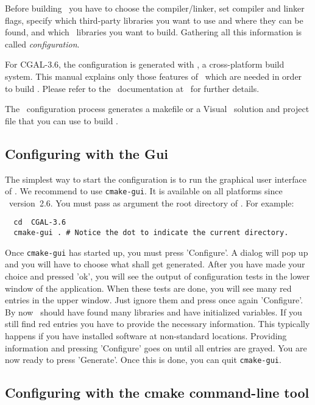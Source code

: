Before building \cgal\ you have to choose the compiler/linker, 
set compiler and linker  flags, specify which
third-party libraries you want to use and where they can be found, and 
which \cgal\ libraries you want to build. Gathering
all this information is called {\em configuration}. 

For CGAL-3.6, the configuration is generated with \cmake, a
cross-platform build system.  This manual explains only those features of
\cmake\ which are needed in order to build \cgal. Please refer to the \cmake\ 
documentation at \cmakepage\ for further details.

The \cmake\ configuration process generates a makefile or a Visual \CC\
solution and project file that you can use to build \cgal.

\subsection{Configuring \cgal{} with the \cmake{} {\sc Gui} }

The simplest way to start the configuration is to run the graphical
user interface of \cmake. We recommend to use \texttt{cmake-gui}. It
is available on all platforms since \cmake\ version~2.6.   You must pass as 
argument the root directory of \cgal. For example:

{\ccTexHtml{\scriptsize}{}
\begin{verbatim}
  cd  CGAL-3.6
  cmake-gui . # Notice the dot to indicate the current directory.
\end{verbatim}
}

Once \texttt{cmake-gui} has started up, you must press 'Configure'. 
A dialog will pop up and you will have to choose what shall get generated.
After you have made your choice and pressed 'ok', you will see
the output of configuration tests in the lower window of the application. 
When these tests are done, you will see many
red entries in the upper window. Just ignore them and  press once again  'Configure'. 
By now \cmake\ should have found many libraries and have initialized variables. 
If you still find red entries you have to provide the necessary information. 
This typically happens if you have installed software at non-standard locations.
Providing information and pressing 'Configure' goes on until 
all entries are grayed. You are now ready to press 'Generate'. Once this is
done, you can quit \texttt{cmake-gui}.

 

\subsection{Configuring \cgal{} with the cmake command-line tool }

